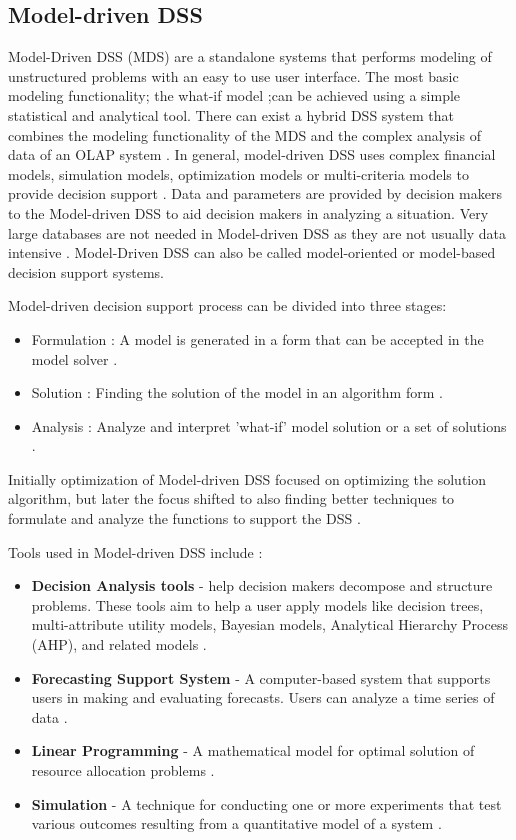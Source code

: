 \subsection{Model-driven DSS}
\label{subsec:ModelDrivenDSS}
Model-Driven DSS (MDS) are a standalone systems that performs modeling of unstructured problems with an easy to use user interface. The most basic modeling functionality; the what-if model ;can be achieved using a simple statistical and analytical tool. There can exist a hybrid DSS system that combines the modeling functionality of the MDS and the complex analysis of data of an OLAP system \cite{DDSTypes}. In general, model-driven DSS uses complex financial models, simulation models, optimization models or multi-criteria models to provide decision support \cite{DDSTypes}. Data and parameters are provided by decision makers to the Model-driven DSS to aid decision makers in analyzing a situation. Very large databases are not needed in Model-driven DSS as they are not usually data intensive \cite{DDSTypes}. Model-Driven DSS can also be called model-oriented or model-based decision support systems.

Model-driven decision support process can be divided into three stages: 
\begin{itemize}
	\item Formulation : A model is generated in a form that can be accepted in the model solver \cite{shim2002past}.
	\item Solution : Finding the solution of the model in an algorithm form \cite{shim2002past}.
	\item Analysis : Analyze and interpret 'what-if' model solution or a set of solutions \cite{shim2002past}.
\end{itemize}

Initially optimization of Model-driven DSS focused on optimizing the solution algorithm, but later the focus shifted to also finding better techniques to formulate and analyze the functions to support the DSS \cite{shim2002past}.

Tools used in Model-driven DSS include \cite{makowski2003modeling}:
\begin{itemize}
	\item \textbf{Decision Analysis tools} - help decision makers decompose and structure problems. These tools aim to help a user apply models like decision trees, multi-attribute utility models, Bayesian models, Analytical Hierarchy Process (AHP), and related models \cite{DDSTypes}.
	\item \textbf{Forecasting Support System} - A computer-based system that supports users in making and evaluating forecasts. Users can analyze a time series of data \cite{DDSTypes}.
	\item \textbf{Linear Programming} - A mathematical model for optimal solution of resource allocation problems \cite{DDSTypes}.
	\item \textbf{Simulation} - A technique for conducting one or more experiments that test various outcomes resulting from a quantitative model of a system \cite{DDSTypes}.
\end{itemize}
